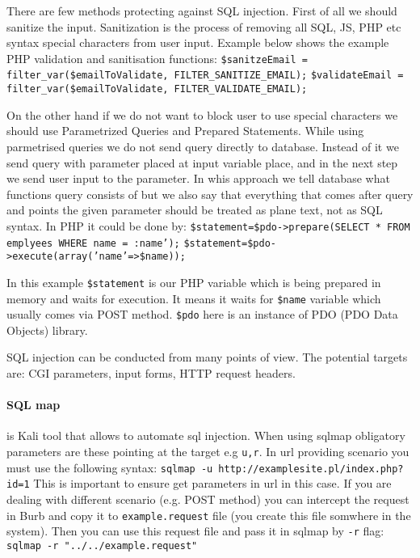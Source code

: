 There are few methods protecting against SQL injection.
First of all we should sanitize the input.
Sanitization is the process of removing all SQL, JS, PHP etc syntax special characters from user input.
Example below shows the example PHP validation and sanitisation functions:
\newline
\newline
\texttt{\$sanitzeEmail = filter\_var(\$emailToValidate, FILTER\_SANITIZE\_EMAIL);}
\newline
\texttt{\$validateEmail = filter\_var(\$emailToValidate, FILTER\_VALIDATE\_EMAIL);}
\newline

On the other hand if we do not want to block user to use special characters we should use Parametrized Queries and Prepared Statements.
While using parmetrised queries we do not send query directly to database.
Instead of it we send query with parameter placed at input variable place, and in the next step we send user input to the parameter.
In whis approach we tell database what functions query consists of but we also say that everything that comes after query and points the given parameter should be treated as plane text, not as SQL syntax.
In PHP it could be done by:
\newline
\newline
\texttt{\$statement=\$pdo->prepare(SELECT * FROM emplyees WHERE name = :name');}
\newline
\texttt{\$statement=\$pdo->execute(array('name'=>\$name));}
\newline

In this example \texttt{\$statement} is our PHP variable  which is being prepared in memory and waits for execution.
It means it waits for \texttt{\$name} variable which usually comes via POST method. \texttt{\$pdo} here is an instance of PDO (PDO Data Objects) library.

SQL injection can be conducted from many points of view.
The potential targets are: CGI parameters, input forms, HTTP request headers.


\paragraph{SQL map} is Kali tool that allows to automate sql injection.
When using sqlmap obligatory parameters are these pointing at the target e.g \texttt{u,r}.
In url providing scenario you must use the following syntax: \texttt{sqlmap -u http://examplesite.pl/index.php?id=1}
\newline
This is important to ensure get parameters in url in this case.
If you are dealing with different scenario (e.g. POST method) you can intercept the request in Burb and copy it to \texttt{example.request} file (you create this file somwhere in the system).
Then you can use this request file and pass it in sqlmap by \texttt{-r} flag: \newline
\texttt{sqlmap -r "../../example.request"}
